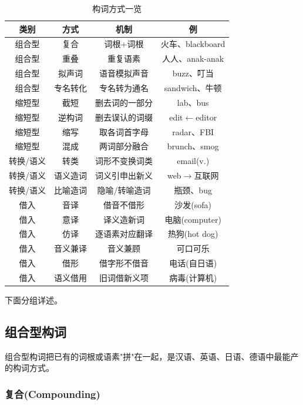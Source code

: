 \begin{table}[H]
\centering
\caption{构词方式一览}
\begin{tabulary}{\textwidth}{@{}CCCC@{}}
\toprule
\textbf{类别} & \textbf{方式} & \textbf{机制} & \textbf{例} \\
\midrule
组合型 & 复合 & 词根+词根 & 火车、blackboard \\
组合型 & 重叠 & 重复语素 & 人人、anak-anak \\
组合型 & 拟声词 & 语音模拟声音 & buzz、叮当 \\
组合型 & 专名转化 & 专名转为通名 & sandwich、牛顿 \\
缩短型 & 截短 & 删去词的一部分 & lab、bus \\
缩短型 & 逆构词 & 删去误认的词缀 & edit$\leftarrow$editor \\
缩短型 & 缩写 & 取各词首字母 & radar、FBI \\
缩短型 & 混成 & 两词部分融合 & brunch、smog \\
转换/语义 & 转类 & 词形不变换词类 & email(v.) \\
转换/语义 & 语义造词 & 词义引申出新义 & web$\rightarrow$互联网 \\
转换/语义 & 比喻造词 & 隐喻/转喻造词 & 瓶颈、bug \\
借入 & 音译 & 借音不借形 & 沙发(sofa) \\
借入 & 意译 & 译义造新词 & 电脑(computer) \\
借入 & 仿译 & 逐语素对应翻译 & 热狗(hot dog) \\
借入 & 音义兼译 & 音义兼顾 & 可口可乐 \\
借入 & 借形 & 借字形不借音 & 电话(自日语) \\
借入 & 语义借用 & 旧词借新义项 & 病毒(计算机) \\
\bottomrule
\end{tabulary}
\end{table}

下面分组详述。

\subsection{组合型构词}

组合型构词把已有的词根或语素"拼"在一起，是汉语、英语、日语、德语中最能产的构词方式。

\subsubsection{复合(Compounding)}

